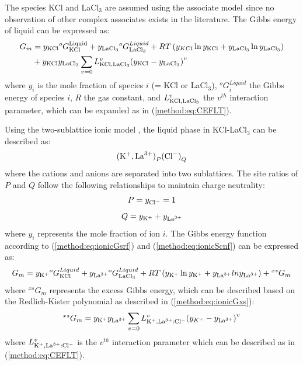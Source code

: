 The species KCl and LaCl$_3$ are assumed using the associate model \cite{sommer1982association} since no observation of other complex associates exists in the literature. The Gibbs energy of liquid can be expressed as: 
\begin{equation} \label{ms:eq:laassmG}
    \begin{aligned}
        G_m&=y_{\rm KCl}{{^o}G}_{\rm KCl}^{\rm Liquid}+y_{\rm {LaCl}_3}{{^o}G}_{\rm {LaCl}_3}^{Liquid}+RT\left(y_{KCl}\ln y_{\rm KCl}+y_{\rm {LaCl}_3}\ln y_{\rm {LaCl}_3}\right)\\&+y_{\rm KCl}y_{\rm {LaCl}_3}\sum_{v=0}{L_{\rm KCl,\rm {LaCl}_3}^v{(y_{\rm KCl}-y_{\rm {LaCl}_3})}^v}
    \end{aligned}
\end{equation}
where $y_i$ is the mole fraction of species $i$ (= KCl or LaCl$_3$), ${{^o}G}_i^{Liquid}$ the Gibbs energy of species $i$, $R$ the gas constant, and $L_{\rm KCl,{LaCl}_3}^v$ the $v^{th}$ interaction parameter, which can be expanded as in (\ref{method:eq:CEFLT}).

Using the two-sublattice ionic model \cite{hillert1985two}, the liquid phase in KCl-LaCl$_3$ can be described as: 
\begin{equation} \label{ms:eq:laionic}
    {({\rm K}^+,{\rm La}^{3+})}_P{({\rm Cl}^-)}_Q
\end{equation}
where the cations and anions are separated into two sublattices. The site ratios of $P$ and $Q$ follow the following relationships to maintain charge neutrality: 
\begin{equation} \label{ms:eq:laionicP}
    P=y_{{\rm Cl}^-}=1
\end{equation}
\begin{equation} \label{ms:eq:laionicQ}
    Q=y_{\rm K^+}+y_{{\rm La}^{3+}}
\end{equation}
where $y_i$ represents the mole fraction of ion $i$. The Gibbs energy function according to (\ref{method:eq:ionicGsrf}) and (\ref{method:eq:ionicScnf}) can be expressed as: 
\begin{equation} \label{ms:eq:laionicGm}
    G_m=y_{\rm K^+}{{^o}G}_{\rm KCl}^{Liquid}+y_{{\rm La}^{3+}}{{^o}G}_{{\rm LaCl}_3}^{Liquid}+RT\left(y_{\rm K^+}\ln y_{\rm K^+}+y_{{\rm La}^{3+}}lny_{{\rm La}^{3+}}\right)+{{^{xs}}G}_m 
\end{equation}
where ${{^{xs}}G}_m$ represents the excess Gibbs energy, which can be described based on the Redlich-Kister polynomial \cite{redlich1948algebraic} as described in (\ref{method:eq:ionicGxs}):
\begin{equation} \label{ms:eq:laionicGxs}
    {{^{xs}}G}_m=y_{\rm K^+}y_{{\rm La}^{3+}}\sum_{v=0}{L_{\rm K^+,{\rm La}^{3+}:{\rm Cl}^-}^v{(y_{K^+}-y_{{\rm La}^{3+}})}^v}
\end{equation}
where $L_{\rm K^+,{\rm La}^{3+}:{\rm Cl}^-}^v$ is the $v^{th}$ interaction parameter which can be described as in (\ref{method:eq:CEFLT}).

